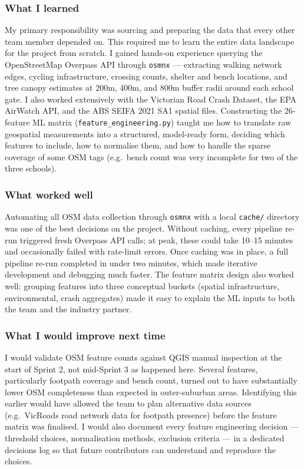 \documentclass[11pt,a4paper]{article}
\begin{document}
\subsubsection*{What I learned}
My primary responsibility was sourcing and preparing the data that every other team member depended on. This required me to learn the entire data landscape for the project from scratch. I gained hands-on experience querying the OpenStreetMap Overpass API through \texttt{osmnx} — extracting walking network edges, cycling infrastructure, crossing counts, shelter and bench locations, and tree canopy estimates at 200m, 400m, and 800m buffer radii around each school gate. I also worked extensively with the Victorian Road Crash Dataset, the EPA AirWatch API, and the ABS SEIFA 2021 SA1 spatial files. Constructing the 26-feature ML matrix (\texttt{feature\_engineering.py}) taught me how to translate raw geospatial measurements into a structured, model-ready form, deciding which features to include, how to normalise them, and how to handle the sparse coverage of some OSM tags (e.g.\ bench count was very incomplete for two of the three schools).

\subsubsection*{What worked well}
Automating all OSM data collection through \texttt{osmnx} with a local \texttt{cache/} directory was one of the best decisions on the project. Without caching, every pipeline re-run triggered fresh Overpass API calls; at peak, these could take 10--15 minutes and occasionally failed with rate-limit errors. Once caching was in place, a full pipeline re-run completed in under two minutes, which made iterative development and debugging much faster. The feature matrix design also worked well: grouping features into three conceptual buckets (spatial infrastructure, environmental, crash aggregates) made it easy to explain the ML inputs to both the team and the industry partner.

\subsubsection*{What I would improve next time}
I would validate OSM feature counts against QGIS manual inspection at the start of Sprint 2, not mid-Sprint 3 as happened here. Several features, particularly footpath coverage and bench count, turned out to have substantially lower OSM completeness than expected in outer-suburban areas. Identifying this earlier would have allowed the team to plan alternative data sources (e.g.\ VicRoads road network data for footpath presence) before the feature matrix was finalised. I would also document every feature engineering decision — threshold choices, normalisation methods, exclusion criteria — in a dedicated decisions log so that future contributors can understand and reproduce the choices.
\end{document}
